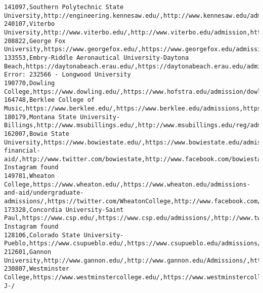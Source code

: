 \documentclass[11pt]{article}
\begin{document}
\begin{Verbatim}[commandchars=\\\{\}]
141097,Southern Polytechnic State University,http://engineering.kennesaw.edu/,http://www.kennesaw.edu/admissions.php,https://twitter.com/KSUEngineering,https://www.facebook.com/KSUEngineering/,https://www.instagram.com/KSUEngineering/
240107,Viterbo University,http://www.viterbo.edu/,http://www.viterbo.edu/admission,https://twitter.com/viterbo\_univ,https://www.facebook.com/ViterboUniversity,https://www.instagram.com/viterbouniversity/
208822,George Fox University,https://www.georgefox.edu/,https://www.georgefox.edu/admission/index.html,https://twitter.com/georgefox,https://www.facebook.com/georgefoxuniversity,https://www.instagram.com/georgefoxuniversity/
133553,Embry-Riddle Aeronautical University-Daytona Beach,https://daytonabeach.erau.edu/,https://daytonabeach.erau.edu/admissions/,https://twitter.com/ERAU\_Daytona,https://www.facebook.com/eraudb,https://www.instagram.com/embryriddledaytona/
Error: 232566 - Longwood University
190770,Dowling College,https://www.dowling.edu/,https://www.hofstra.edu/admission/dowling.html,//www.twitter.com/hofstrau,//www.facebook.com/hofstrau,//instagram.com/hofstrau
164748,Berklee College of Music,https://www.berklee.edu/,https://www.berklee.edu/admissions,https://www.twitter.com/BerkleeCollege,https://www.facebook.com/BerkleeCollege,https://www.instagram.com/berkleecollege/
180179,Montana State University-Billings,http://www.msubillings.edu/,http://www.msubillings.edu/reg/admission.htm,https://twitter.com/msubillings,https://www.facebook.com/MSUBillings,https://instagram.com/msubillings
162007,Bowie State University,https://www.bowiestate.edu/,https://www.bowiestate.edu/admissions-financial-aid/,http://www.twitter.com/bowiestate,http://www.facebook.com/bowiestate,No Instagram found
149781,Wheaton College,https://www.wheaton.edu/,https://www.wheaton.edu/admissions-and-aid/undergraduate-admissions/,https://twitter.com/WheatonCollege,http://www.facebook.com/wheatoncollegeil,https://www.instagram.com/wheatoncollegeil
173328,Concordia University-Saint Paul,https://www.csp.edu/,https://www.csp.edu/admissions/,http://www.twitter.com/CSPBearsWBB,https://www.facebook.com/ConcordiaStPaul/,No Instagram found
128106,Colorado State University-Pueblo,https://www.csupueblo.edu/,https://www.csupueblo.edu/admissions/,https://twitter.com/csupueblo,https://www.facebook.com/ColoradoStateUniversityPueblo,https://www.instagram.com/csupueblo/
212601,Gannon University,http://www.gannon.edu/,http://www.gannon.edu/Admissions/,http://www.gannon.edu/twitter,http://www.gannon.edu/facebook,https://www.instagram.com/gannonu
230807,Westminster College,https://www.westminstercollege.edu/,https://www.westminstercollege.edu/about/resources/admissions,https://twitter.com/westminsterslc,https://www.facebook.com/westminsterslc,https://www.instagram.com/p/Bpa9LGWH-J-/

\end{Verbatim}
\end{document}

